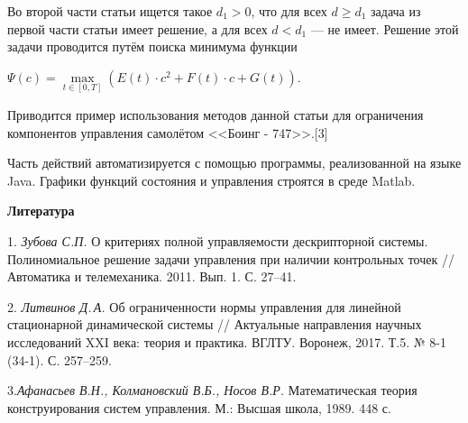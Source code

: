 Во второй части статьи ищется такое $d_{1}>0$, что для всех $d\geqslant d_{1}$ задача из первой части статьи имеет решение, а для всех $d<d_{1}$ --- не имеет. Решение этой задачи проводится путём поиска минимума функции

$\Psi (c)=\max\limits_{t\in[0,T]}(E(t)\cdot c^{2}+F(t)\cdot c+G(t))$.

Приводится пример использования методов данной статьи для ограничения  компонентов управления самолётом <<Боинг - 747>>.[3]

Часть действий автоматизируется с помощью программы, реализованной на языке Java.
Графики функций состояния и уп\-ра\-в\-ле\-ния строятся в среде Matlab.

\smallskip \centerline{\bf Литература}\nopagebreak

1. \textit{Зубова С.П.} О критериях полной управляемости дескрипторной системы. Полиномиальное решение задачи управления при наличии контрольных точек // Автоматика и телемеханика. 2011. Вып. 1. С. 27--41.

2. \textit{Литвинов Д.\,А.}
Об ограниченности нормы управления для линейной стационарной динамической системы
//
Актуальные направления научных исследований XXI века: теория и практика. ВГЛТУ. Воронеж, 2017. Т.5. № 8-1 (34-1). С. 257--259.

3.\textit{Афанасьев В.Н., Колмановский В.Б., Носов В.Р. } Математическая теория конструирования систем управления. М.: Высшая школа, 1989. 448 с.

